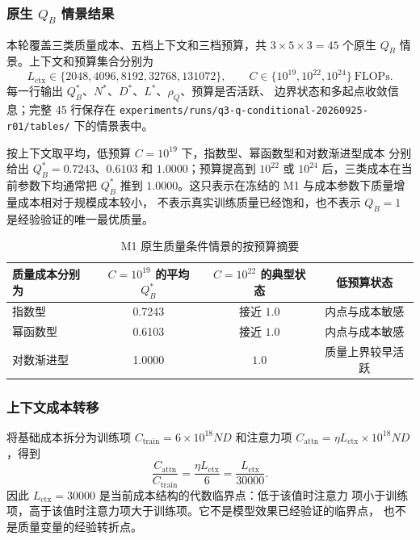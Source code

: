 \subsubsection{原生 $Q_B$ 情景结果}

本轮覆盖三类质量成本、五档上下文和三档预算，共
$3\times5\times3=45$ 个原生 $Q_B$ 情景。上下文和预算集合分别为
\[
 L_{\mathrm{ctx}}\in\{2048,4096,8192,32768,131072\},\qquad
 C\in\{10^{19},10^{22},10^{24}\}\ \mathrm{FLOPs}.
\]
每一行输出 $Q_B^*$、$N^*$、$D^*$、$L^*$、$\rho_Q$、预算是否活跃、
边界状态和多起点收敛信息；完整 45 行保存在
\texttt{experiments/runs/q3-q-conditional-20260925-r01/tables/}
下的情景表中。

按上下文取平均，低预算 $C=10^{19}$ 下，指数型、幂函数型和对数渐进型成本
分别给出 $Q_B^*=0.7243$、$0.6103$ 和 $1.0000$；预算提高到
$10^{22}$ 或 $10^{24}$ 后，三类成本在当前参数下均通常把 $Q_B^*$ 推到
$1.0000$。这只表示在冻结的 M1 与成本参数下质量增量成本相对于规模成本较小，
不表示真实训练质量已经饱和，也不表示 $Q_B=1$ 是经验验证的唯一最优质量。

\begin{table}[htbp]
  \centering
  \caption{M1 原生质量条件情景的按预算摘要}
  \label{tab:q3-sp2-summary}
  \small
  \begin{tabular}{lccc}
    \toprule
    质量成本分别为 & $C=10^{19}$ 的平均 $Q_B^*$ & $C=10^{22}$ 的典型状态 & 低预算状态\\
    \midrule
    指数型 & 0.7243 & 接近 $1.0$ & 内点与成本敏感\\
    幂函数型 & 0.6103 & 接近 $1.0$ & 内点与成本敏感\\
    对数渐进型 & 1.0000 & $1.0$ & 质量上界较早活跃\\
    \bottomrule
  \end{tabular}
\end{table}

\subsubsection{上下文成本转移}

将基础成本拆分为训练项 $C_{\mathrm{train}}=6\times10^{18}ND$ 和注意力项
$C_{\mathrm{attn}}=\eta L_{\mathrm{ctx}}\times10^{18}ND$，得到
\begin{equation}
 \frac{C_{\mathrm{attn}}}{C_{\mathrm{train}}}
 =\frac{\eta L_{\mathrm{ctx}}}{6}
 =\frac{L_{\mathrm{ctx}}}{30000}.
 \label{eq:q3-sp2-context-ratio}
\end{equation}
因此 $L_{\mathrm{ctx}}=30000$ 是当前成本结构的代数临界点：低于该值时注意力
项小于训练项，高于该值时注意力项大于训练项。它不是模型效果已经验证的临界点，
也不是质量变量的经验转折点。


